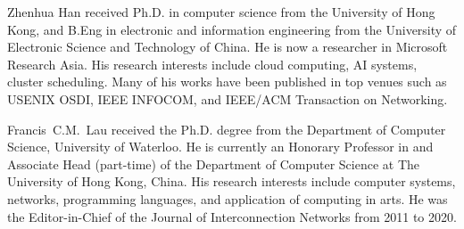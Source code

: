 \begin{IEEEbiography}{Zhenhua Han}
    received Ph.D. in computer science from the University of Hong Kong, and B.Eng in electronic and information engineering from the University of Electronic Science and Technology of China. He is now a researcher in Microsoft Research Asia. His research interests include cloud computing, AI systems, cluster scheduling. Many of his works have been published in top venues such as USENIX OSDI, IEEE INFOCOM, and IEEE/ACM Transaction on Networking.
\end{IEEEbiography}
\vspace{-1cm}

\begin{IEEEbiography}{Francis~C.M.~Lau}
    received the Ph.D. degree from the Department of Computer Science, University of Waterloo. He is currently an Honorary Professor in and Associate Head (part-time) of the Department of Computer Science at The University of Hong Kong, China. His research interests include computer systems, networks, programming languages, and application of computing in arts. He was the Editor-in-Chief of the Journal of Interconnection Networks from 2011 to 2020.
\end{IEEEbiography}
\vspace{-1cm}
